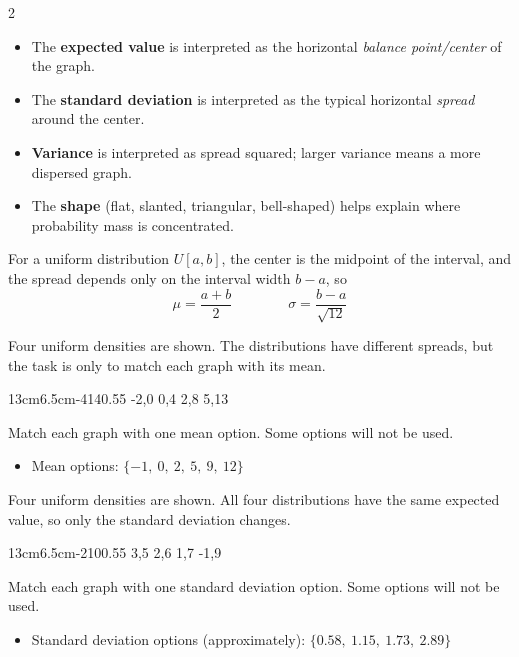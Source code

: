 \begin{multicols}{2}

\vspace{-0.25cm}
\begin{itemize}
\item The \textbf{expected value} is interpreted as the horizontal \emph{balance point/center} of the graph.
\item The \textbf{standard deviation} is interpreted as the typical horizontal \emph{spread} around the center.
\item \textbf{Variance} is interpreted as spread squared; larger variance means a more dispersed graph.
\item The \textbf{shape} (flat, slanted, triangular, bell-shaped) helps explain where probability mass is concentrated.
\end{itemize}

\vspace{-0.25cm}
For a uniform distribution $U[a,b]$, the center is the midpoint of the interval, and the spread depends only on the interval width $b-a$, so
\[
\mu=\frac{a+b}{2}
\qquad \qquad
\sigma=\frac{b-a}{\sqrt{12}}
\]

\vspace{-0.25cm}
Four uniform densities are shown. The distributions have different spreads, but the task is only to match each graph with its mean.

\UniformFourGraph
{13cm}{6.5cm}{-4}{14}{0.55}
{-2,0}
{0,4}
{2,8}
{5,13}

Match each graph with one mean option. Some options will not be used.
\begin{itemize}
\item Mean options: $\{-1,\ 0,\ 2,\ 5, \ 9,\ 12\}$
\end{itemize}

\vspace{-0.25cm}
Four uniform densities are shown. All four distributions have the same expected value, so only the standard deviation changes.

\UniformFourGraph
{13cm}{6.5cm}{-2}{10}{0.55}
{3,5}
{2,6}
{1,7}
{-1,9}

Match each graph with one standard deviation option. Some options will not be used.
\begin{itemize}
\item Standard deviation options (approximately): $\{0.58,\ 1.15,\ 1.73,\ 2.89\}$
\end{itemize}


\end{multicols}
